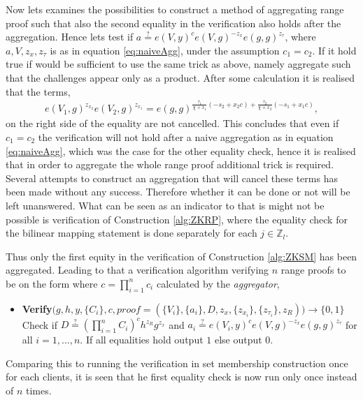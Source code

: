 Now lets examines the possibilities to construct a method of aggregating range proof such that also the second equality in the verification also holds after the aggregation. Hence lets test if $a \overset{?}{=} e(V,y)^c e(V,g)^{-z_x}e(g,g)^{z_\tau}$, where $a,V,z_{x},z_\tau$  is as in equation \eqref{eq:naiveAgg}, under the assumption $c_1=c_2$. If it hold true if would be sufficient to use the same trick as above, namely aggregate such that the challenges appear only as a product. After some calculation it is realised that the terms,
\begin{align*}
e(V_1,g)^{z_{x_2}}e(V_2,g)^{z_{x_1}} = e(g,g)^{\frac{\tau_1}{\chi + x_1}(-s_2+x_2c) +\frac{\tau_2}{\chi + x_2}(-s_1+x_1c)   } ,
\end{align*}
on the right side of the equality are not cancelled. This concludes that even if $c_1=c_2$ the verification will not hold after a naive aggregation as in equation \eqref{eq:naiveAgg}, which was the case for the other equality check,  hence it is realised that in order to aggregate the whole range proof additional trick is required. Several attempts to construct an aggregation that will cancel these terms has been made without any success. Therefore whether it can be done or not will be left unanswered. What can be seen as an indicator to that is might not be possible is verification of Construction \ref{alg:ZKRP}, where the equality check for the bilinear mapping statement is done separately for each $j\in\mathds{Z}_l$. 




Thus  only the first equity  in the verification of Construction \ref{alg:ZKSM} has been aggregated. Leading to that a verification algorithm verifying $n$ range proofs to be on the form where $c=\prod_{i=1}^n c_i$ calculated by the \textit{aggregator},
\begin{itemize}
\item \textbf{Verify}$\big(g,h,y,\{C_i\},c,proof= (\{V_i\},\{a_i\}, D,z_x,\{z_{x_i}\}, \{z_{\tau_i}\}, z_R))\to \{0,1\}$\\
Check if $D \overset{?}{=}( \prod_{i=1}^n C_i )^{c}h^{z_R}g^{z_x}$ and $a_i \overset{?}{=} e(V_i,y)^ce(V,g)^{-z_x}e(g,g)^{z_\tau}$ for all $i=1,...,n$. If all equalities hold output $1$ else output $0$.
\end{itemize}
Comparing this to running the verification in set membership construction once for each clients, it is seen that he first equality check is now run only once instead of $n$ times. 

